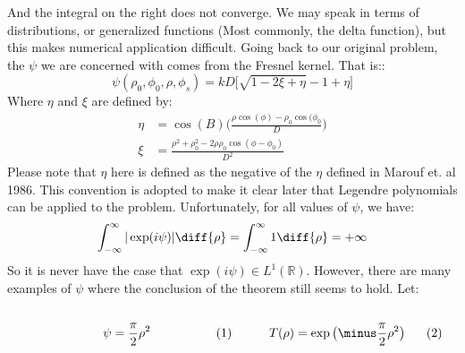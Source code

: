 \documentclass[crop=false,class=book,oneside]{standalone}
\begin{document}
            And the integral on the right does not converge. We may
            speak in terms of distributions, or generalized
            functions (Most commonly, the delta function), but this
            makes numerical application difficult. Going back to
            our original problem, the $\psi$ we are concerned with
            comes from the Fresnel kernel. That is::
            \begin{equation}
                \psi(\rho_{0},\phi_{0},\rho,\phi_{s})
                =kD\Big[\sqrt{1-2\xi+\eta}-1+\eta\Big]
            \end{equation}
            Where $\eta$ and $\xi$ are defined by:
            \begin{subequations}
                \begin{align}
                    \eta&=\cos(B)\Big(
                    \frac{\rho\cos(\phi)-\rho_{0}\cos(\phi_{0}}{D}
                    \Big)\\
                    \xi&=\frac{\rho^{2}+\rho_{0}^{2}-2\rho\rho_{0}
                               \cos(\phi-\phi_{0})}{D^{2}}
                \end{align}
            \end{subequations}
            Please note that $\eta$ here is defined as the negative
            of the $\eta$ defined in Marouf et. al 1986. This
            convention is adopted to make it clear later that
            Legendre polynomials can be applied to the problem.
            Unfortunately, for all values of $\psi$, we have:
            \begin{equation}
                \int_{-\infty}^{\infty}|\exp(i\psi)|\diff{\rho}
                =\int_{-\infty}^{\infty}1\diff{\rho}=+\infty
            \end{equation}
            So it is never have the case that
            $\exp(i\psi)\in L^{1}(\mathbb{R})$. However, there are
            many examples of $\psi$ where the conclusion of the
            theorem still seems to hold. Let:
            \par
            \begin{subequations}
                \begin{minipage}[b]{0.49\textwidth}
                    \centering
                    \begin{equation}
                        \psi=\frac{\pi}{2}\rho^{2}
                    \end{equation}
                \end{minipage}
                \hfill
                \begin{minipage}[b]{0.49\textwidth}
                    \centering
                    \begin{equation}
                        T(\rho)=
                        \exp\big(\minus\frac{\pi}{2}\rho^{2}\big)
                    \end{equation}
                \end{minipage}
            \end{subequations}
\end{document}
